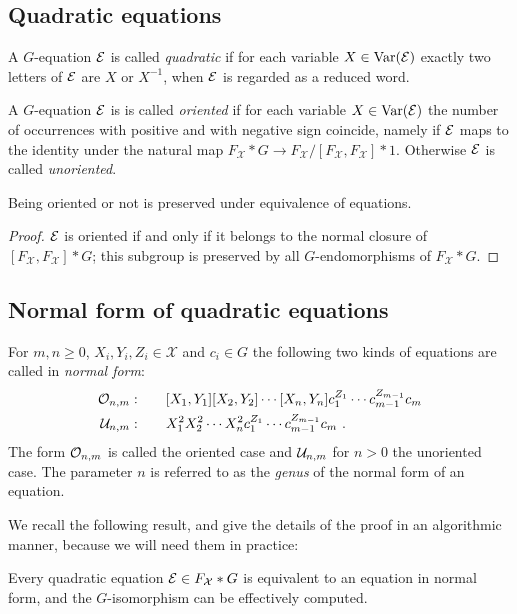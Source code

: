\documentclass[a4paper,11pt]{amsart}
\begin{document}
\subsection{Quadratic equations}
A $G$-equation $\mathcal{E}$ is called \emph{quadratic} if for each variable
$X\in \textup{Var}(\mathcal{E})$ exactly two letters of $\mathcal{E}$ are $X$ or $X^{-1}$, when
$\mathcal{E}$ is regarded as a reduced word.

A $G$-equation $\mathcal{E}$ is is called \emph{oriented} if for each variable
$X\in \textup{Var}(\mathcal{E})$ the number of occurrences with positive and with
negative sign coincide, namely if $\mathcal{E}$ maps to the identity under the
natural map $F_{\mathcal{X}}*G\to F_{\mathcal{X}}/[F_{\mathcal{X}},F_{\mathcal{X}}]*1$. 
Otherwise $\mathcal{E}$ is called \emph{unoriented}.
\begin{lem}
 Being oriented or not is preserved under equivalence of equations.
\end{lem}
\begin{proof}
  $\mathcal{E}$ is oriented if and only if it belongs to the normal closure of
  $[F_{\mathcal{X}},F_{\mathcal{X}}]*G$; this subgroup is preserved by all $G$-endomorphisms
  of $F_{\mathcal{X}}*G$.
\end{proof}

\subsection{Normal form of quadratic equations} \label{sec:normal_form}
\begin{defi}[$\eq{O}_{n,m}, \eq{U}_{n,m}$]
  For $m,n\ge0$, $X_i,Y_i,Z_i \in\mathcal{X}$ and $c_i \in G$ the following two kinds of
  equations are called in \emph{normal form}:
 \begin{align}
  \mathcal{O}_{n,m}:\qquad & [X_1,Y_1][X_2,Y_2]\cdots[X_n,Y_n]c_1^{Z_1}\cdots c_{m-1}^{Z_{m-1}}c_m  \\
   \mathcal{U}_{n,m}:\qquad & X_1^2X_2^2\cdots X_n^2 c_1^{Z_1}\cdots c_{m-1}^{Z_{m-1}}c_m\ .
 \end{align} 
 The form $\mathcal{O}_{n,m}$ is called the oriented case and $\mathcal{U}_{n,m}$ for
 $n>0$ the unoriented case.  The parameter $n$ is referred to as
 the \emph{genus} of the normal form of an equation.
\end{defi}

We recall the following result, and give the details of the proof in
an algorithmic manner, because we will need them in practice:
\begin{thm} \label{Thm:equationNormalForm}
  Every quadratic equation $\mathcal{E} \in F_{\mathcal{X}}*G$ is equivalent to an equation
  in normal form, and the $G$-isomorphism can be effectively computed.
\end{thm}
\end{document}
